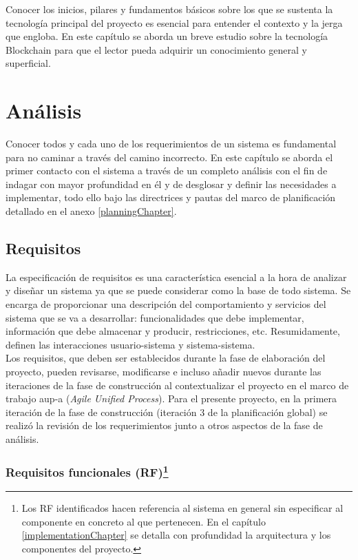 \documentclass[12pt,a4paper, twoside]{report}
\begin{document}
	Conocer los inicios, pilares y fundamentos básicos sobre los que se sustenta la tecnología principal del proyecto es esencial para entender el contexto y la jerga que engloba. En este capítulo se aborda un breve estudio sobre la tecnología Blockchain para que el lector pueda adquirir un conocimiento general y superficial.
				
	\chapter{Análisis} \label{analysisChapter}
		
	Conocer todos y cada uno de los requerimientos de un sistema es fundamental para no caminar a través del camino incorrecto. En este capítulo se aborda el primer contacto con el sistema a través de un completo análisis con el fin de indagar con mayor profundidad en él y de desglosar y definir las necesidades a implementar, todo ello bajo las directrices y pautas del marco de planificación detallado en el anexo \ref{planningChapter}.

	\section{Requisitos}

	La especificación de requisitos es una característica esencial a la hora de analizar y diseñar un sistema ya que se puede considerar como la base de todo sistema. Se encarga de proporcionar una descripción del comportamiento y servicios del sistema que se va a desarrollar: funcionalidades que debe implementar, información que debe almacenar y producir, restricciones, etc. Resumidamente, definen las interacciones usuario-sistema y sistema-sistema.\\
	
	Los requisitos, que deben ser establecidos durante la fase de elaboración del proyecto, pueden revisarse, modificarse e incluso añadir nuevos durante las iteraciones de la fase de construcción al contextualizar el proyecto en el marco de trabajo \gls{aup-a} (\textit{Agile Unified Process}). Para el presente proyecto, en la primera iteración de la fase de construcción (iteración 3 de la planificación global) se realizó la revisión de los requerimientos junto a otros aspectos de la fase de análisis.

	\subsection[Requisitos funcionales (RF)]{Requisitos funcionales (RF)\footnote{Los RF identificados hacen referencia al sistema en general sin especificar al componente en concreto al que pertenecen. En el capítulo \ref{implementationChapter} se detalla con profundidad la arquitectura y los componentes del proyecto.}}
	
\end{document}
